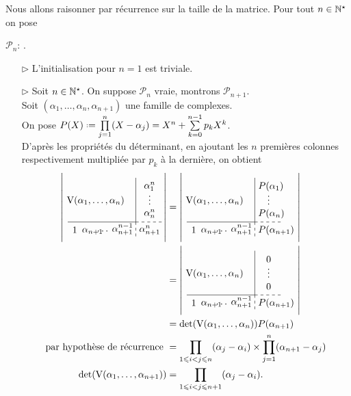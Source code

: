 \newcommand{\detvandzero}{
\left|\begin{gathered}
    \tikzpicture[every node/.style={anchor=south west}]
        \node[minimum width=2cm,minimum height=1.5cm] at (-0.16,0.625) {$\Vandermonde(\alpha_1, \dots, \alpha_n)$};
        \node[minimum width=0.5cm,minimum height=0.5cm] at (0,0.05) {$1$};
        \node[minimum width=0.5cm,minimum height=0.5cm] at (0.4, 0) {$\alpha_{n+1}$};
        \node[minimum width=0.5cm,minimum height=0.5cm] at (0.95,0) {$\cdots$};
        \node[minimum width=0.5cm,minimum height=0.5cm] at (1.5,0) {$\alpha_{n+1}^{n-1}$};
        \node[minimum width=1cm,minimum height=0.5cm] at (2.5,0) {$P(\alpha_{n+1})$};
        \node[minimum width=1cm,minimum height=1cm] at (2.5,0.4) {$0$};
        \node[minimum width=1cm,minimum height=1cm] at (2.5,1) {$\vdots$};
        \node[minimum width=1cm,minimum height=1cm] at (2.5,1.4) {$0$};
        \draw (0,0.6) -- (2.5,0.6);
        \draw (2.5,0.6) -- (2.5,2.225);
        \draw[dashed] (2.5,0.6) -- (3.5,0.6);
        \draw[dashed] (2.5,0.6) -- (2.5,0);
    \endtikzpicture
    \end{gathered}\right|
}

\begin{preuve}
    Nous allons raisonner par récurrence sur la taille de la matrice. Pour tout $n \in \mathbb{N}^\star$ on pose
    \begin{center}
            $\mathscr{P}_n$: .
        \end{center}
    \begin{itemize}
        \item[$\rhd$] L'initialisation pour $n = 1$ est triviale.
        \item[$\rhd$] Soit $n \in \mathbb{N}^\star$. On suppose $\mathscr{P}_n$ vraie, montrons $\mathscr{P}_{n+1}$. \\ 
        Soit $(\alpha_1, \dots, \alpha_n, \alpha_{n+1})$ une famille de complexes. \\
        On pose $P(X) \defeq \prod\limits_{j=1}^n (X-\alpha_j) = X^n + \sum\limits_{k=0}^{n-1} p_k X^k$. \\
        D'après les propriétés du déterminant, en ajoutant les $n$ premières colonnes respectivement multipliée par $p_k$ à la dernière, on obtient
        \begin{align*}
            \detvandnplusun &= \detvandpoly \\
            &= \detvandzero \\
            &= \det(\Vandermonde(\alpha_1, \dots, \alpha_n)) P(\alpha_{n+1}) \\
            \text{par hypothèse de récurrence } &= \prod\limits_{1\leqslant i < j \leqslant n}(\alpha_j - \alpha_i) \times \prod\limits_{j=1}^n (\alpha_{n+1}-\alpha_j) \\
            \det(\Vandermonde(\alpha_1, \dots, \alpha_{n+1})) &= \prod_{1\leqslant i < j \leqslant n + 1}(\alpha_j - \alpha_i).
        \end{align*}
    \end{itemize}
\end{preuve}

